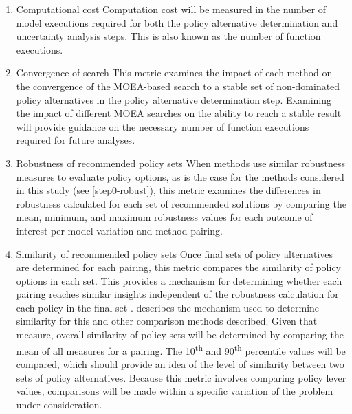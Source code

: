 \begin{enumerate}[leftmargin=*,align=left,label=\textbf{Comparison \arabic* :}]
\begin{enumerate}[resume,leftmargin=*,align=left,label=\textbf{Comparison \arabic* :}]
    \item Computational cost \label{compare-computationcost} \newline
          Computation cost will be measured in the number of model executions required for both the policy alternative determination and uncertainty analysis steps. This is also known as the number of function executions.

    \item Convergence of search \newline
          This metric examines the impact of each method on the convergence of the MOEA-based search to a stable set of non-dominated policy alternatives in the policy alternative determination step. Examining the impact of different MOEA searches on the ability to reach a stable result will provide guidance on the necessary number of function executions required for future analyses.

    \item Robustness of recommended policy sets \label{compare-robustness} \newline
          When methods use similar robustness measures to evaluate policy options, as is the case for the methods considered in this study (see \cref{step0-robust}), this metric examines the differences in robustness calculated for each set of recommended solutions by comparing the mean, minimum, and maximum robustness values for each outcome of interest per model variation and method pairing.
    
    \item Similarity of recommended policy sets \newline
          Once final sets of policy alternatives are determined for each pairing, this metric compares the similarity of policy options in each set. This provides a mechanism for determining whether each pairing reaches similar insights independent of the robustness calculation for each policy in the final set \citep{Hall2012}.  describes the mechanism used to determine similarity for this and other comparison methods described. Given that measure, overall similarity of policy sets will be determined by comparing the mean of all measures for a pairing. The 10\textsuperscript{th} and 90\textsuperscript{th} percentile values will be compared, which should provide an idea of the level of similarity between two sets of policy alternatives. Because this metric involves comparing policy lever values, comparisons will be made within a specific variation of the problem under consideration.


\end{enumerate}
\end{enumerate}
